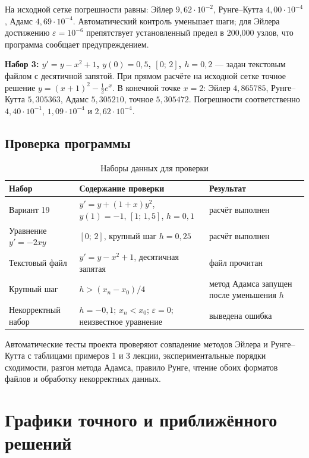 \documentclass[12pt,a4paper]{article}
\begin{document}
На исходной сетке погрешности равны: Эйлер $9{,}62\cdot10^{-2}$,
Рунге--Кутта $4{,}00\cdot10^{-4}$, Адамс $4{,}69\cdot10^{-4}$.
Автоматический контроль уменьшает шаги; для Эйлера достижению
$\varepsilon=10^{-6}$ препятствует установленный предел в 200,000 узлов,
что программа сообщает предупреждением.

\medskip
\noindent\textbf{Набор 3: $y'=y-x^2+1$, $y(0)=0{,}5$, $[0;\,2]$,
$h=0{,}2$} --- задан текстовым файлом с десятичной запятой. При прямом расчёте
на исходной сетке точное решение
$y=(x+1)^2-\tfrac12e^{x}$. В конечной точке $x=2$: Эйлер $4{,}865785$,
Рунге--Кутта $5{,}305363$, Адамс $5{,}305210$, точное $5{,}305472$.
Погрешности соответственно $4{,}40\cdot10^{-1}$, $1{,}09\cdot10^{-4}$
и $2{,}62\cdot10^{-4}$.

\subsection{Проверка программы}

\begin{table}[H]
  \centering
  \caption{Наборы данных для проверки}
  \begin{tabular}{C{3.6cm}C{6.4cm}C{3.6cm}}
    \toprule
    \textbf{Набор} & \textbf{Содержание проверки} & \textbf{Результат} \\
    \midrule
    Вариант 19 & $y'=y+(1+x)y^2$, $y(1)=-1$, $[1;\,1{,}5]$, $h=0{,}1$ & расчёт выполнен \\
    Уравнение $y'=-2xy$ & $[0;\,2]$, крупный шаг $h=0{,}25$ & расчёт выполнен \\
    Текстовый файл & $y'=y-x^2+1$, десятичная запятая & файл прочитан \\
    Крупный шаг & $h>(x_n-x_0)/4$ & метод Адамса запущен после уменьшения $h$ \\
    Некорректный набор & $h=-0{,}1$; $x_n<x_0$; $\varepsilon=0$; неизвестное уравнение & выведена ошибка \\
    \bottomrule
  \end{tabular}
\end{table}

Автоматические тесты проекта проверяют совпадение методов Эйлера и Рунге--Кутта
с таблицами примеров 1 и 3 лекции, экспериментальные порядки сходимости, разгон
метода Адамса, правило Рунге, чтение обоих форматов файлов и обработку
некорректных данных.

\clearpage
\section{Графики точного и приближённого решений}
\end{document}
